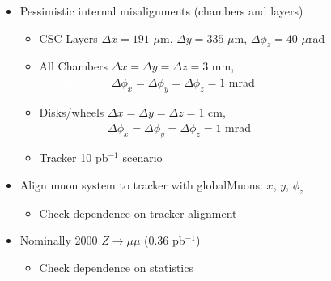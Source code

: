 \documentclass[compress]{beamer}
\begin{document}
\begin{frame}
\begin{itemize}\setlength{\itemsep}{0.75 cm}
  \item Pessimistic internal misalignments (chambers and layers)
    \begin{itemize}\setlength{\itemsep}{0.25 cm}
    \item CSC Layers $\Delta x = 191$ $\mu$m, $\Delta y = 335$ $\mu$m, $\Delta \phi_z = 40$ $\mu$rad
    \item All Chambers $\Delta x = \Delta y = \Delta z = 3$ mm, \\ \textcolor{white}{All Chambers} $\Delta \phi_x = \Delta \phi_y = \Delta \phi_z = 1$ mrad
    \item Disks/wheels $\Delta x = \Delta y = \Delta z = 1$ cm, \\ \textcolor{white}{Disks/wheels} $\Delta \phi_x = \Delta \phi_y = \Delta \phi_z = 1$ mrad
    \item Tracker 10 pb$^{-1}$ scenario
    \end{itemize}

  \item Align muon system to tracker with globalMuons: $x$, $y$, $\phi_z$
\begin{itemize}
  \item Check dependence on tracker alignment
\end{itemize}

  \item Nominally 2000 $Z\to\mu\mu$ (0.36 pb$^{-1}$)
\begin{itemize}
  \item Check dependence on statistics
\end{itemize}
\end{itemize}
\end{frame}
\end{document}
